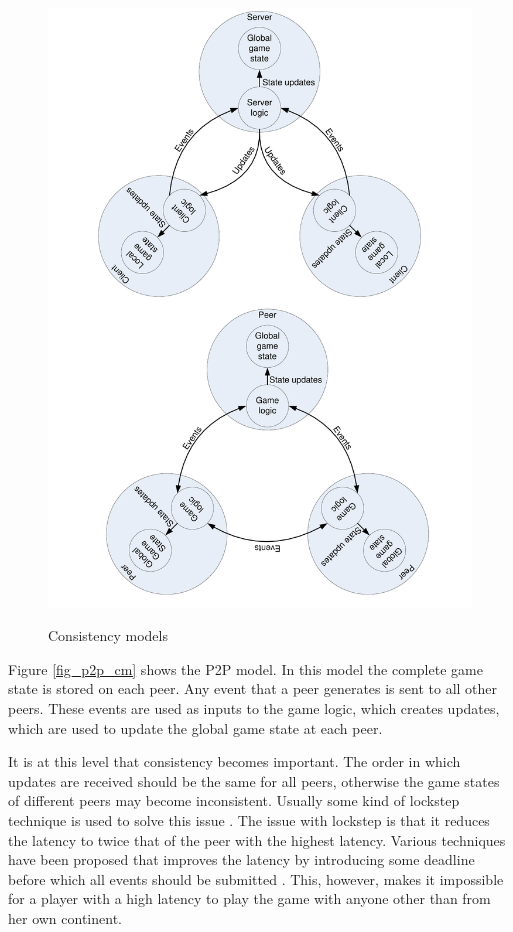 \documentclass[10pt,a4paper,journal,cspaper,compsoc]{IEEEtran}
\begin{document}
\begin{figure}[htbp]
{\includegraphics[clip=true, viewport= 2.5cm 15cm 19cm 30cm, width=\columnwidth]{CS_P2P_CMs}}
\caption{Consistency models}
\end{figure}
%
Figure \ref{fig_p2p_cm} shows the P2P model. In this model the complete game state is stored on each peer. Any event that a peer generates is sent to
all other peers. These events are used as inputs to the game logic, which creates updates, which are used to update the global game state at each
peer.

It is at this level that consistency becomes important. The order in which updates are received should be the same for all peers, otherwise the game
states of different peers may become inconsistent. Usually some kind of lockstep technique is used to solve this issue \cite{pessimistic_lock_step}.
The issue with lockstep is that it reduces the latency to twice that of the peer with the highest latency. Various techniques have been proposed that
improves the latency by introducing some deadline before which all events should be submitted \cite{cheat_proof_event_ordering}. This, however, makes
it impossible for a player with a high latency to play the game with anyone other than from her own continent.
\end{document}
